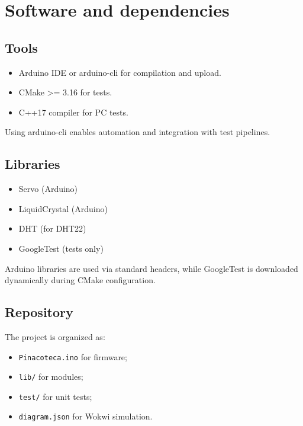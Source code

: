 \chapter{Software and dependencies}

\section{Tools}
\begin{itemize}
  \item Arduino IDE or arduino-cli for compilation and upload.
  \item CMake >= 3.16 for tests.
  \item C++17 compiler for PC tests.
\end{itemize}
Using arduino-cli enables automation and integration with test pipelines.

\section{Libraries}
\begin{itemize}
  \item Servo (Arduino)
  \item LiquidCrystal (Arduino)
  \item DHT (for DHT22)
  \item GoogleTest (tests only)
\end{itemize}
Arduino libraries are used via standard headers, while GoogleTest is downloaded dynamically during CMake configuration.

\section{Repository}
The project is organized as:
\begin{itemize}
  \item \texttt{Pinacoteca.ino} for firmware;
  \item \texttt{lib/} for modules;
  \item \texttt{test/} for unit tests;
  \item \texttt{diagram.json} for Wokwi simulation.
\end{itemize}
